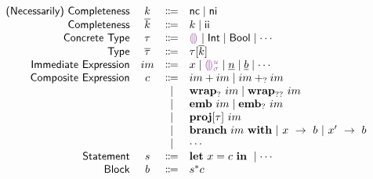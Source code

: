 



\begin{center}
  \[\begin{array}{rccl}
    \SortNComplete & \SortNCompleteVar & \Coloneqq & \CNC \mid \CNI                                                                              \\
    \SortComplete  & \SortCompleteVar  & \Coloneqq & \SortNCompleteVar \mid \CII                                                                 \\
    \SortTypCon    & \SortTypConVar    & \Coloneqq & \TCHole \mid \TCInt \mid \TCBool \mid \cdots                                                   \\
    \SortTyp       & \SortTypVar       & \Coloneqq & \SortTypConVar[\SortCompleteVar]                                                            \\
    \SortImm       & \SortImmVar       & \Coloneqq & x \mid \EEHole{\SortHoleId}{\sigma}
                                                   \mid \underline{n} \mid \underline{b} \mid \cdots                                              \\
    \SortComp      & \SortCompVar      & \Coloneqq & \EPlusPrim{\SortImmVar}{\SortImmVar} 
                                                   \mid \EPlusIndet{\SortImmVar}{\SortImmVar} \\
                   &                   & \mid         & \EWrapIndet{\SortImmVar}
                                                   \mid \EWrapMaybe{\SortImmVar} \\
                   &                   & \mid         & \EEmbedPrim{\SortImmVar}
                                                   \mid \EEmbedIndet{\SortImmVar} \\
                   &                   & \mid         & \EProj{\SortImmVar}{\SortTypConVar} \\
                   &                   & \mid         & \EBranchWith{\SortImmVar}
                                                     \EBranchBr{x}{\SortBlockVar}
                                                    ~\EBranchBr{x'}{\SortBlockVar} \\
                   &                   & \mid         & \cdots \\
    \SortStmt      & \SortStmtVar      & \Coloneqq & \ELet{x}{\SortCompVar} \EInn \mid \cdots                                                    \\
    \SortBlock      & \SortBlockVar      & \Coloneqq & \SortStmtVar^{*} \SortCompVar
  \end{array}\]
\end{center}
